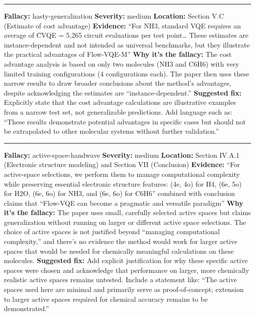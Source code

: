 \documentclass[10pt,letterpaper]{article}
\begin{document}
\begin{center}\rule{0.5\linewidth}{0.5pt}\end{center}

\textbf{Fallacy:} hasty-generalization
\textbf{Severity:} medium
\textbf{Location:} Section V.C (Estimate of cost advantage)
\textbf{Evidence:} ``For NH3, standard VQE requires an average of C̄VQE = 5,265 circuit evaluations per test point\ldots{} These estimates are instance-dependent and not intended as universal benchmarks, but they illustrate the practical advantages of Flow-VQE-M''
\textbf{Why it's the fallacy:} The cost advantage analysis is based on only two molecules (NH3 and C6H6) with very limited training configurations (4 configurations each). The paper then uses these narrow results to draw broader conclusions about the method's advantages, despite acknowledging the estimates are ``instance-dependent.''
\textbf{Suggested fix:} Explicitly state that the cost advantage calculations are illustrative examples from a narrow test set, not generalizable predictions. Add language such as: ``These results demonstrate potential advantages in specific cases but should not be extrapolated to other molecular systems without further validation.''

\begin{center}\rule{0.5\linewidth}{0.5pt}\end{center}

\textbf{Fallacy:} active-space-handwave
\textbf{Severity:} medium
\textbf{Location:} Section IV.A.1 (Electronic structure modeling) and Section VII (Conclusion)
\textbf{Evidence:} ``For active-space selections, we perform them to manage computational complexity while preserving essential electronic structure features: (4e, 4o) for H4, (6e, 5o) for H2O, (6e, 6o) for NH3, and (6e, 6o) for C6H6'' combined with conclusion claims that ``Flow-VQE can become a pragmatic and versatile paradigm''
\textbf{Why it's the fallacy:} The paper uses small, carefully selected active spaces but claims generalization without running on larger or different active space selections. The choice of active spaces is not justified beyond ``managing computational complexity,'' and there's no evidence the method would work for larger active spaces that would be needed for chemically meaningful calculations on these molecules.
\textbf{Suggested fix:} Add explicit justification for why these specific active spaces were chosen and acknowledge that performance on larger, more chemically realistic active spaces remains untested. Include a statement like: ``The active spaces used here are minimal and primarily serve as proof-of-concept; extension to larger active spaces required for chemical accuracy remains to be demonstrated.''
\end{document}
